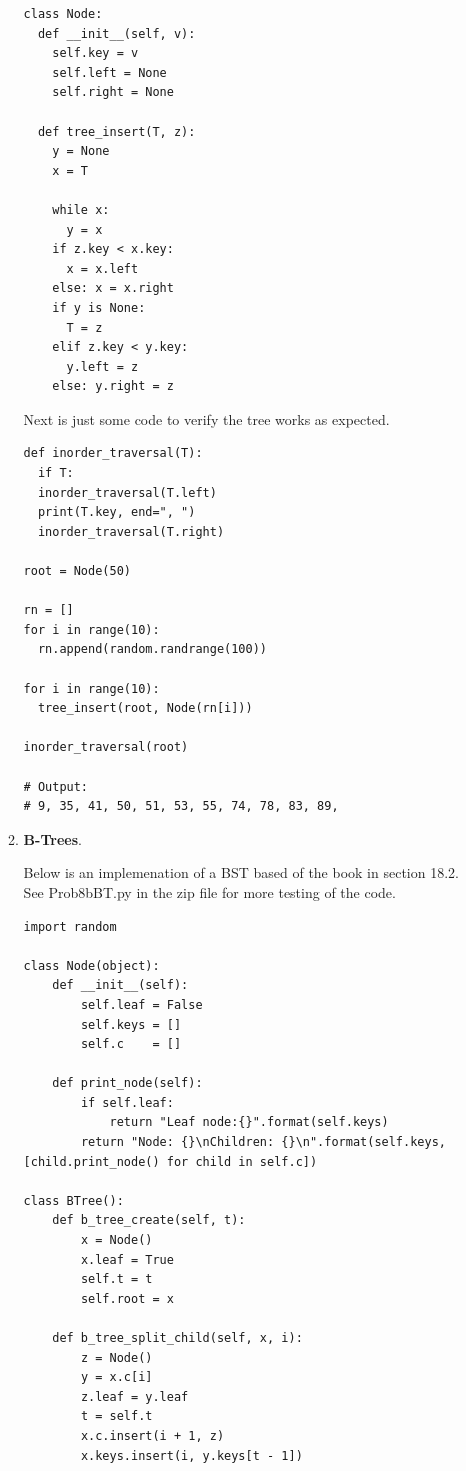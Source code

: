 \documentclass{article}
\begin{document}
\begin{enumerate}
\begin{enumerate}
    \begin{lstlisting}
class Node: 
  def __init__(self, v): 
    self.key = v 
    self.left = None
    self.right = None
              
  def tree_insert(T, z): 
    y = None
    x = T
    
    while x:
      y = x
    if z.key < x.key:
      x = x.left
    else: x = x.right
    if y is None:
      T = z
    elif z.key < y.key:
      y.left = z
    else: y.right = z  
    \end{lstlisting}    

  Next is just some code to verify the tree works as expected.

    \begin{lstlisting}            
def inorder_traversal(T): 
  if T: 
  inorder_traversal(T.left) 
  print(T.key, end=", ") 
  inorder_traversal(T.right)  

root = Node(50)

rn = []
for i in range(10):
  rn.append(random.randrange(100))
    
for i in range(10):
  tree_insert(root, Node(rn[i]))    
    
inorder_traversal(root)

# Output:
# 9, 35, 41, 50, 51, 53, 55, 74, 78, 83, 89, 
    \end{lstlisting}  

    \item \textbf{B-Trees}.

    Below is an implemenation of a BST based of the book in section 18.2.
    See Prob8bBT.py in the zip file for more testing of the code.

    \begin{lstlisting}
import random

class Node(object):
    def __init__(self):
        self.leaf = False
        self.keys = []
        self.c    = []
        
    def print_node(self):
        if self.leaf:
            return "Leaf node:{}".format(self.keys)
        return "Node: {}\nChildren: {}\n".format(self.keys, [child.print_node() for child in self.c])

class BTree():
    def b_tree_create(self, t):
        x = Node()
        x.leaf = True
        self.t = t
        self.root = x
        
    def b_tree_split_child(self, x, i):
        z = Node()
        y = x.c[i]
        z.leaf = y.leaf
        t = self.t
        x.c.insert(i + 1, z)        
        x.keys.insert(i, y.keys[t - 1])  
        

\end{lstlisting}
\end{enumerate}
\end{enumerate}
\end{document}
